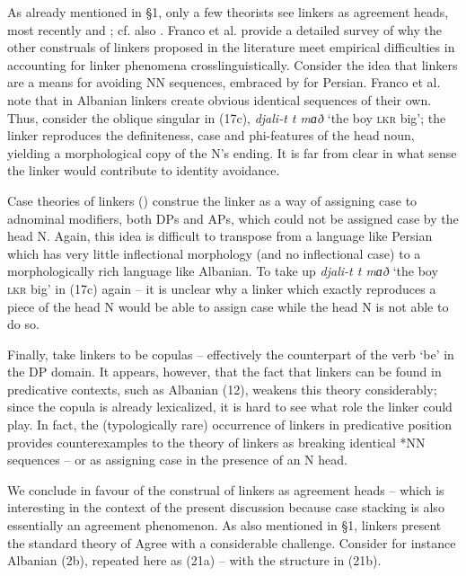 \documentclass[output=paper]{langsci/langscibook}
\begin{document}
As already mentioned in §1, only a few theorists see linkers as agreement heads, most recently \citet{Philip2012} and \citet{Franco2015}; cf. also \citet{Zwart2006}. Franco et al. provide a detailed survey of why the other construals of linkers proposed in the literature meet empirical difficulties in accounting for linker phenomena crosslinguistically. Consider the idea that linkers are a means for avoiding NN sequences, embraced by \citet{Richards2010} for Persian. Franco et al. note that in Albanian linkers create obvious identical sequences of their own. Thus, consider the oblique singular in (17c), \textit{djali-t t mɑð} ‘the boy \textsc{lkr} big’; the linker reproduces the definiteness, case and phi-features of the head noun, yielding a morphological copy of the N’s ending. It is far from clear in what sense the linker would contribute to identity avoidance.

  Case theories of linkers (\citealt{Larson2008}) construe the linker as a way of assigning case to adnominal modifiers, both DPs and APs, which could not be assigned case by the head N. Again, this idea is difficult to transpose from a language like Persian which has very little inflectional morphology (and no inflectional case) to a morphologically rich language like Albanian. To take up \textit{djali-t t mɑð} ‘the boy \textsc{lkr} big’ in (17c) again – it is unclear why a linker which exactly reproduces a piece of the head N would be able to assign case while the head N is not able to do so.    

  Finally, \citet{Dikken2004} take linkers to be copulas – effectively the counterpart of the verb ‘be’ in the DP domain. It appears, however, that the fact that linkers can be found in predicative contexts, such as Albanian (12), weakens this theory considerably; since the copula is already lexicalized, it is hard to see what role the linker could play. In fact, the (typologically rare) occurrence of linkers in predicative position provides counterexamples to the theory of linkers as breaking identical *NN sequences – or as assigning case in the presence of an N head. 

  We conclude in favour of the construal of linkers as agreement heads – which is interesting in the context of the present discussion because case stacking is also essentially an agreement phenomenon. As also mentioned in §1, linkers present the standard theory of Agree with a considerable challenge. Consider for instance Albanian (2b), repeated here as (21a) – with the structure in (21b).
\end{document}
